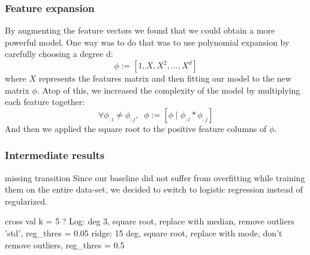 \documentclass[10pt,conference,compsocconf]{IEEEtran}
\begin{document}
\subsubsection{Feature expansion}
By augmenting the feature vectors we found that we could obtain a more 
powerful model. One way was to do that was to use polynomial expansion 
by carefully choosing a degree d:
$$\phi := [1, X, X^2, ..., X^d]$$
where $X$ represents the features matrix and then fitting our model 
to the new matrix $\phi$. Atop of this, we increased the complexity 
of the model by multiplying each feature together:
$$\forall \phi_{:i} \neq \phi_{:j}, \;\; \phi := [\phi\; |\; \phi_{:i} * \phi_{:j}] $$
And then we applied the square root to the positive feature columns 
of $\phi$.

\subsubsection{Intermediate results}
missing transition
Since our baseline did not suffer from overfitting while training them on the entire
data-set, we decided to switch to logistic regression instead of regularized.

cross val k = 5 ?
Log: deg 3, square root, replace with median, remove outliers 'std', reg\_thres = 0.05
ridge: 15 deg, square root, replace with mode, don't remove outliers, reg\_thres = 0.5
\end{document}
